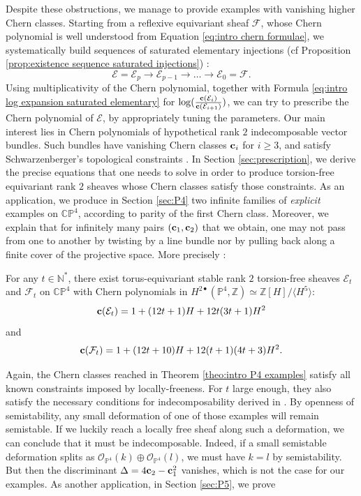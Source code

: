 \documentclass[a4paper,10pt]{amsart}
\theoremstyle{plain}{
    \newtheorem{theorem}{Theorem}[section]
    \newtheorem{lemma}[theorem]{Lemma}
    \newtheorem{corollary}[theorem]{Corollary}
    \newtheorem{proposition}[theorem]{Proposition}
    \newtheorem{conjecture}[theorem]{Conjecture}
}
\theoremstyle{definition}{
    \newtheorem{definition}[theorem]{Definition}
    \newtheorem{defn-thm}[theorem]{Definition-Theorem}
    \newtheorem{example}[theorem]{Example}
    \newtheorem{notation}[theorem]{Notation}
}
\theoremstyle{remark}{
    \newtheorem{remark}[theorem]{Remark}
    \newtheorem{problem}[theorem]{Problem}
    \newtheorem{question}[theorem]{Question}
}
\def\uc{{\bf c}}
\def\cF{\mathcal{F}}
\def\cE{\mathcal{E}}
\def\cO{\mathcal{O}}
\def\Z{\mathbb{Z}}
\def\N{\mathbb{N}}
\def\P{\mathbb{P}}
\def\C{\mathbb{C}}
\begin{document}
 Despite these obstructions, we manage to provide examples with vanishing higher Chern classes. Starting from a reflexive equivariant sheaf $\cF$, whose Chern polynomial is well understood from Equation \eqref{eq:intro chern formulae}, we  systematically build sequences of saturated elementary injections (cf Proposition \ref{prop:existence sequence saturated injections}) :
 $$
 \cE=\cE_p\to\cE_{p-1}\to \ldots \to \cE_0=\cF.
 $$
Using multiplicativity of the Chern polynomial, together with Formula \eqref{eq:intro log expansion saturated elementary} for  $\log(\frac{\uc(\cE_i)}{\uc(\cE_{i+1})})$, we can try to prescribe the Chern polynomial of $\cE$, by appropriately tuning the parameters. Our main interest lies in Chern polynomials of hypothetical rank $2$ indecomposable vector bundles. Such bundles have vanishing Chern classes $\uc_i$ for $i\geq 3$, and satisfy Schwarzenberger's topological constraints \cite[Appendix 1]{Hirz}. In Section \ref{sec:prescription}, we derive the precise equations that one needs to solve in order to produce torsion-free equivariant rank $2$ sheaves whose Chern classes satisfy those constraints. As an application, we produce in Section \ref{sec:P4} two infinite families of {\it explicit} examples on $\C\P^4$, according to parity of the first Chern class.  Moreover, we explain that for infinitely many pairs $(\uc_1,\uc_2)$ that we obtain, one may not pass from one to another by twisting by a line bundle nor by pulling back along a finite cover of the projective space. More precisely :
\begin{theorem}
 \label{theo:intro P4 examples}
 For any $t\in\N^*$, there exist torus-equivariant stable rank $2$ torsion-free sheaves $\cE_t$ and $\cF_t$ on $\C\P^4$ with Chern polynomials in $H^{2\bullet}(\P^4,\Z)\simeq \Z[H]/\langle H^{5}\rangle$:
 $$\uc(\cE_t)=1+(12t+1)H+12t(3t+1)H^2$$
 and 
 $$\uc(\cF_t)=1+(12t+10)H+12(t+1)(4t+3)H^2.
 $$
\end{theorem}
Again, the Chern classes reached in Theorem \ref{theo:intro P4 examples} satisfy all known constraints imposed by locally-freeness. For $t$ large enough, they also satisfy the necessary conditions for indecomposability derived in \cite{HoSch}. By openness of semistability, any small deformation of one of those examples will remain semistable. If we luckily reach a locally free sheaf along such a deformation, we can conclude that it must be indecomposable. Indeed, if a small semistable deformation splits as $\cO_{\P^4}(k)\oplus\cO_{\P^4}(l)$, we must have $k=l$ by semistability. But then the discriminant $\Delta=4\uc_2-\uc_1^2$ vanishes, which is not the case for our examples. As another application, in Section \ref{sec:P5}, we prove
\end{document}
